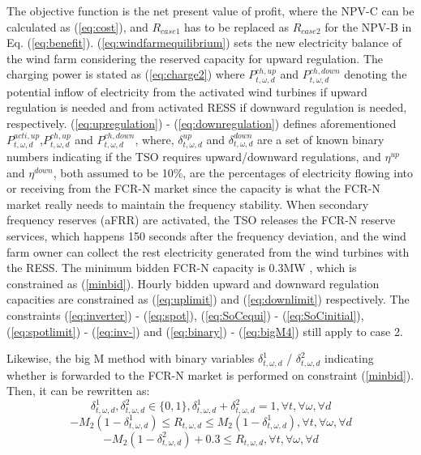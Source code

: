 \documentclass[final,5p,times,twocolumn,authoryear]{elsarticle}
\begin{document}
The objective function is the net present value of profit, where the NPV-C can be calculated as (\ref{eq:cost}), and $R_{case1}$ has to be replaced as $R_{case2}$ for the NPV-B in Eq. (\ref{eq:benefit}).  (\ref{eq:windfarmequilibrium}) sets the new electricity balance of the wind farm considering the reserved capacity for upward regulation. The charging power is stated as  (\ref{eq:charge2}) where $P_{t,\omega,d}^{ch,up}$ and  $P_{t,\omega,d}^{ch,down}$ denoting the potential inflow of electricity from the activated wind turbines if upward regulation is needed and from activated RESS if downward regulation is needed, respectively.  (\ref{eq:upregulation}) - (\ref{eq:downregulation}) defines aforementioned  $P_{t,\omega,d}^{acti,up}$,$P_{t,\omega,d}^{ch,up}$ and $P_{t,\omega,d}^{ch,down}$, where, $\delta_{t,\omega,d}^{up}$ and $\delta_{t,\omega,d}^{down}$ are a set of known binary numbers indicating if the TSO requires upward/downward regulations, and $\eta^{up}$ and $\eta^{down}$, both assumed to be 10\%, are the percentages of electricity flowing into or receiving from the FCR-N market since the capacity is what the FCR-N market really needs to maintain the frequency stability. When secondary frequency reserves (aFRR) are activated, the TSO releases the FCR-N reserve services, which happens 150 seconds \cite{symmetrical} after the frequency deviation, and the wind farm owner can collect the rest electricity generated from the wind turbines with the RESS. The minimum bidden FCR-N capacity is 0.3MW \cite{symmetrical}, which is constrained as (\ref{minbid}). Hourly bidden upward and downward regulation capacities are constrained as (\ref{eq:uplimit}) and (\ref{eq:downlimit}) respectively. The constraints (\ref{eq:inverter}) - (\ref{eq:spot}), (\ref{eq:SoCequi}) - (\ref{eq:SoCinitial}), (\ref{eq:spotlimit}) - (\ref{eq:inv-}) and (\ref{eq:binary}) - (\ref{eq:bigM4}) still apply to case 2.

Likewise, the big M method with binary variables $\delta_{t,\omega,d}^{1}$ / $\delta_{t,\omega,d}^{2}$ indicating whether is forwarded to the FCR-N market is performed on constraint (\ref{minbid}). Then, it can be rewritten as:
\begin{equation} \label{eq:binary2}
\delta_{t,\omega,d}^{1},\delta_{t,\omega,d}^{2} \in \{0,1\}, \delta_{t,\omega,d}^{1}+\delta_{t,\omega,d}^{2} = 1, \forall t,\forall \omega,\forall d
\end{equation}
\begin{equation} \label{eq:bigM1}
-M_2(1-\delta_{t,\omega,d}^{1}) \leq R_{t,\omega,d}\leq M_2(1-\delta_{t,\omega,d}^{1}), \forall t,\forall \omega,\forall d
\end{equation}
\begin{equation} \label{eq:bigM2}
-M_2(1-\delta_{t,\omega,d}^{2}) + 0.3 \leq R_{t,\omega,d}, \forall t,\forall \omega,\forall d
\end{equation}
\end{document}
